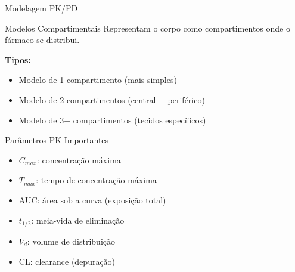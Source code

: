 \begin{frame}{Modelagem PK/PD}

\vspace{0.3cm}

\begin{block}{Modelos Compartimentais}
Representam o corpo como compartimentos onde o fármaco se distribui.

\textbf{Tipos:}
\begin{itemize}
    \item Modelo de 1 compartimento (mais simples)
    \item Modelo de 2 compartimentos (central + periférico)
    \item Modelo de 3+ compartimentos (tecidos específicos)
\end{itemize}
\end{block}

\begin{exampleblock}{Parâmetros PK Importantes}
\begin{itemize}
    \item $C_{max}$: concentração máxima
    \item $T_{max}$: tempo de concentração máxima
    \item AUC: área sob a curva (exposição total)
    \item $t_{1/2}$: meia-vida de eliminação
    \item $V_d$: volume de distribuição
    \item CL: clearance (depuração)
\end{itemize}
\end{exampleblock}
\end{frame}

